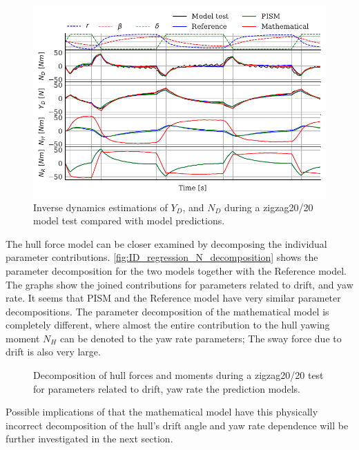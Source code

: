 \begin{figure}[h]
    \centering
    \includegraphics[width=\columnwidth]{figures/results.ID_zigzag20.pdf}
    \caption{Inverse dynamics estimations of $Y_D$, and $N_D$ during a zigzag20/20 model test compared with model predictions.}
    \label{fig:ID_zigzag20}
\end{figure}

The hull force model can be closer examined by decomposing the individual parameter contributions. \autoref{fig:ID_regression_N_decomposition} shows the parameter decomposition for the two models together with the Reference model. The graphs show the joined contributions for parameters related to drift, and yaw rate. It seems that PISM and the Reference model have very similar parameter decompositions.
The parameter decomposition of the mathematical model is completely different, where almost the entire contribution to the hull yawing moment $N_H$ can be denoted to the yaw rate parameters; The sway force due to drift is also very large.  
\begin{figure}[h]
    \begin{center}
        
        \caption{Decomposition of hull forces and moments during a zigzag20/20 test for parameters related to drift, yaw rate the prediction models.}
        \label{fig:ID_regression_N_decomposition}
    \end{center}
\end{figure}
Possible implications of that the mathematical model have this physically incorrect decomposition of the hull's drift angle and yaw rate dependence will be further investigated in the next section.